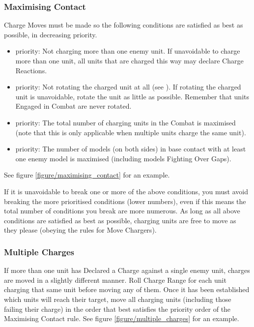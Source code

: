 \subsubsection{Maximising Contact}
\label{maximising_contact}

Charge Moves must be made so the following conditions are satisfied as best as possible, in decreasing priority.

\begin{itemize}[label={-}]
\item {} priority: Not charging more than one enemy unit. If unavoidable to charge more than one unit, all units that are charged this way may declare Charge Reactions.
\item {} priority: Not rotating the charged unit at all (see ). If rotating the charged unit is unavoidable, rotate the unit as little as possible. Remember that units Engaged in Combat are never rotated.
\item {} priority: The total number of charging units in the Combat is maximised (note that this is only applicable when multiple units charge the same unit).
\item {} priority: The number of models (on both sides) in base contact with at least one enemy model is maximised (including models Fighting Over Gaps).
\end{itemize}

See figure \ref{figure/maximising_contact} for an example.

If it is unavoidable to break one or more of the above conditions, you must avoid breaking the more prioritised conditions (lower numbers), even if this means the total number of conditions you break are more numerous. As long as all above conditions are satisfied as best as possible, charging units are free to move as they please (obeying the rules for Move Chargers).

\subsubsection{Multiple Charges}

If more than one unit has Declared a Charge against a single enemy unit, charges are moved in a slightly different manner. Roll Charge Range for each unit charging that same unit before moving any of them. Once it has been established which units will reach their target, move all charging units (including those failing their charge) in the order that best satisfies the priority order of the Maximising Contact rule. See figure \ref{figure/multiple_charges} for an example.

